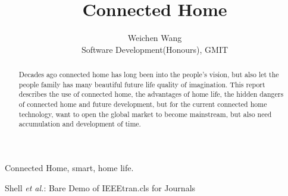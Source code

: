 \documentclass[report]{IEEEtran}
\begin{document}
\title{Connected Home}
\author{Weichen Wang

Software Development(Honours), GMIT}
\maketitle
\begin{abstract}
Decades ago connected home has long been into the people's vision, but also let the people family has many beautiful future life quality of imagination. This report describes the use of connected home, the advantages of home life, the hidden dangers of connected home and future development, but for the current connected home technology, want to open the global market to become mainstream, but also need accumulation and development of time.
\end{abstract}

\begin{IEEEkeywords}
 Connected Home, smart, home life.
\end{IEEEkeywords}
% 
{Shell \MakeLowercase{\textit{et al.}}: Bare Demo of IEEEtran.cls for Journals} 
\end{document}
